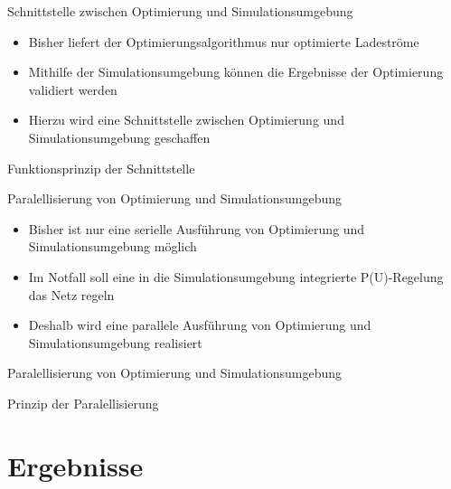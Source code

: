 \documentclass[aspectratio=169]{beamer}
\begin{document}
\begin{frame}{Schnittstelle zwischen Optimierung und Simulationsumgebung}
	\begin{itemize}
		\item Bisher liefert der Optimierungsalgorithmus nur optimierte
		Ladeströme
		\item Mithilfe der Simulationsumgebung können die Ergebnisse
		der Optimierung validiert werden
		\item Hierzu wird eine Schnittstelle zwischen Optimierung und
		Simulationsumgebung geschaffen
	\end{itemize}
\end{frame}


\begin{frame}{Funktionsprinzip der Schnittstelle}
	\begin{figure}
		\centering
		
	\end{figure}
\end{frame}


\begin{frame}{Paralellisierung von Optimierung und Simulationsumgebung}
	\begin{itemize}
		\item Bisher ist nur eine serielle Ausführung von Optimierung und
		Simulationsumgebung möglich
		\item Im Notfall soll eine in die Simulationsumgebung integrierte
		P(U)-Regelung das Netz regeln
		\item Deshalb wird eine parallele Ausführung von Optimierung und
		Simulationsumgebung realisiert
	\end{itemize}
\end{frame}


\begin{frame}{Paralellisierung von Optimierung und Simulationsumgebung}
	\begin{figure}
		\centering
		
	\end{figure}
\end{frame}


\begin{frame}{Prinzip der Paralellisierung}
	\begin{figure}
		\centering
		
	\end{figure}
\end{frame}


\section{Ergebnisse}
\end{document}
